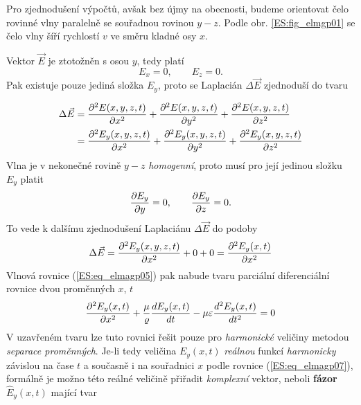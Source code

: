 {      Pro zjednodušení výpočtů, avšak bez újmy na obecnosti, budeme orientovat čelo rovinné vlny 
      paralelně se souřadnou rovinou \(y-z\). Podle obr. \ref{ES:fig_elmgp01} se čelo vlny šíří 
      rychlostí \(v\) ve směru kladné osy \(x\).
      
      Vektor \(\vec{E}\) je ztotožněn s osou \(y\), tedy platí
      \begin{equation}\label{ES:eq_elmagp08}
         E_x = 0, \qquad E_z = 0.
      \end{equation}
      Pak existuje pouze jediná složka \(E_y\), proto se Laplacián \(\Delta\vec{E}\) zjednoduší do 
      tvaru
      
      \begin{align*}                  %
        \Delta\vec{E} &= \ppder{E(x,y,z,t)}{x} + 
                         \ppder{E(x,y,z,t)}{y} + \ppder{E(x,y,z,t)}{z}      \\
                      &= \ppder{E_y(x,y,z,t)}{x} + 
                         \ppder{E_y(x,y,z,t)}{y} + \ppder{E_y(x,y,z,t)}{z}
      \end{align*}
      Vlna je v nekonečné rovině \(y-z\) \emph{homogenní}, proto musí pro její jedinou složku 
      \(E_y\) platit
      \begin{equation}\label{ES:eq_elmagp10}
        \dfrac{\partial E_y}{\partial y} = 0, \qquad \dfrac{\partial E_y}{\partial z} = 0.
      \end{equation}
      To vede k dalšímu zjednodušení Laplaciánu \(\Delta\vec{E}\) do podoby
      \begin{equation}\label{ES:eq_elmagp11}
        \Delta\vec{E} = \dfrac{\partial^2 E_y(x,y,z,t)}{\partial x^2} + 0 + 0 = \dfrac{\partial^2 E_y(x,t)}{\partial x^2}
      \end{equation}
      Vlnová rovnice (\ref{ES:eq_elmagp05}) pak nabude tvaru parciální diferenciální rovnice dvou 
      proměnných \(x\), \(t\)
      \begin{equation}\label{ES:eq_elmagp12}
        \dfrac{\partial^2 E_y(x,t)}{\partial x^2} + 
        \frac{\mu}{\varrho}\dfrac{d E_y(x,t)}{d t} - 
        \mu\varepsilon\dfrac{d^2 E_y(x,t)}{d t^2} = 0
      \end{equation}
      V uzavřeném tvaru lze tuto rovnici řešit pouze pro \emph{harmonické} veličiny metodou 
      \emph{separace proměnných}. Je-li tedy veličina \(E_y(x,t)\) \emph{reálnou} funkcí 
      \emph{harmonicky} závislou na čase \(t\) a současně i na souřadnici \(x\) podle rovnice 
      (\ref{ES:eq_elmagp07}), formálně je možno této reálné veličině přiřadit \emph{komplexní}
      vektor, neboli \textbf{fázor} \(\hat{E}_y(x,t)\) mající tvar
}
